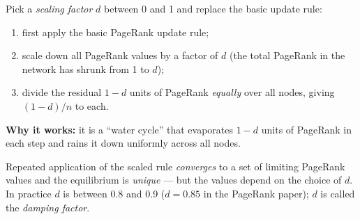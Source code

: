 \documentclass[11pt,a4paper]{article}
\theoremstyle{definition}
\providecommand{\uv}[1]{``#1''}
\begin{document}
\begin{defbox}
Pick a \emph{scaling factor} $d$ between 0 and 1 and replace the basic update rule:
\begin{enumerate}
\item first apply the basic PageRank update rule;
\item scale down all PageRank values by a factor of $d$ (the total PageRank in the network has shrunk
      from 1 to $d$);
\item divide the residual $1-d$ units of PageRank \emph{equally} over all nodes, giving $(1-d)/n$ to
      each.
\end{enumerate}
\textbf{Why it works:} it is a \uv{water cycle} that evaporates $1-d$ units of PageRank in each step
and rains it down uniformly across all nodes.

Repeated application of the scaled rule \emph{converges} to a set of limiting PageRank values and the
equilibrium is \emph{unique} --- but the values depend on the choice of $d$. In practice $d$ is
between 0.8 and 0.9 ($d=0.85$ in the PageRank paper); $d$ is called the \emph{damping factor}.
\end{defbox}
\end{document}
